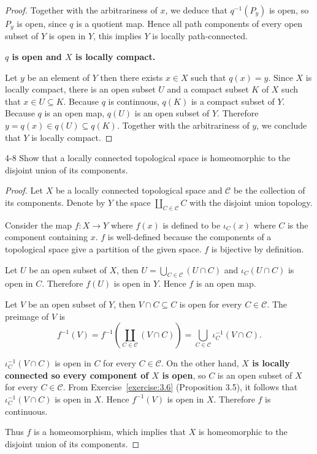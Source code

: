 \begin{proof}
	Together with the arbitrariness of $x$, we deduce that $q^{-1}(P_{y})$ is open, so $P_{y}$ is open, since $q$ is a quotient map. Hence all path components of every open subset of $Y$ is open in $Y$, this implies $Y$ is locally path-connected.

	\textbf{$q$ is open and $X$ is locally compact.}

	Let $y$ be an element of $Y$ then there exists $x\in X$ such that $q(x) = y$. Since $X$ is locally compact, there is an open subset $U$ and a compact subset $K$ of $X$ such that $x \in U \subseteq K$. Because $q$ is continuous, $q(K)$ is a compact subset of $Y$. Because $q$ is an open map, $q(U)$ is an open subset of $Y$. Therefore $y = q(x) \in q(U) \subseteq q(K)$. Together with the arbitrariness of $y$, we conclude that $Y$ is locally compact.
\end{proof}

\begin{problem}{4-8}\label{problem:4-8}
Show that a locally connected topological space is homeomorphic to the disjoint union of its components.
\end{problem}

\begin{proof}
	Let $X$ be a locally connected topological space and $\mathscr{C}$ be the collection of its components. Denote by $Y$ the space $\coprod_{C\in\mathscr{C}}C$ with the disjoint union topology.

	Consider the map $f: X\to Y$ where $f(x)$ is defined to be $\iota_{C}(x)$ where $C$ is the component containing $x$. $f$ is well-defined because the components of a topological space give a partition of the given space. $f$ is bijective by definition.

	Let $U$ be an open subset of $X$, then $U = \bigcup_{C\in\mathscr{C}}(U\cap C)$ and $\iota_{C}(U\cap C)$ is open in $C$. Therefore $f(U)$ is open in $Y$. Hence $f$ is an open map.

	Let $V$ be an open subset of $Y$, then $V\cap C \subseteq C$ is open for every $C\in\mathscr{C}$. The preimage of $V$ is
	\begin{equation*}
		f^{-1}(V) = f^{-1}\left( \coprod_{C\in\mathscr{C}} (V\cap C) \right) = \bigcup_{C\in\mathscr{C}}\iota_{C}^{-1}(V\cap C).
	\end{equation*}

	$\iota_{C}^{-1}(V\cap C)$ is open in $C$ for every $C\in\mathscr{C}$. On the other hand, \textbf{$X$ is locally connected so every component of $X$ is open}, so $C$ is an open subset of $X$ for every $C\in\mathscr{C}$. From Exercise~\ref{exercise:3.6} (Proposition 3.5), it follows that $\iota_{C}^{-1}(V\cap C)$ is open in $X$. Hence $f^{-1}(V)$ is open in $X$. Therefore $f$ is continuous.

	Thus $f$ is a homeomorphism, which implies that $X$ is homeomorphic to the disjoint union of its components.
\end{proof}

